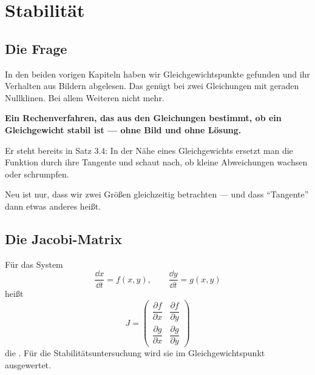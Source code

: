 \chapter{Stabilität}

\section{Die Frage}

In den beiden vorigen Kapiteln haben wir Gleichgewichtspunkte gefunden und ihr Verhalten aus Bildern abgelesen. Das genügt bei zwei Gleichungen mit geraden Nullklinen. Bei allem Weiteren nicht mehr.

\begin{merksatz}
\begin{center}
\begin{minipage}{0.9\textwidth}
\textbf{Ein Rechenverfahren, das aus den Gleichungen bestimmt, ob ein Gleichgewicht stabil ist --- ohne Bild und ohne Lösung.}
\end{minipage}
\end{center}

Er steht bereits in Satz 3.4: In der Nähe eines Gleichgewichts ersetzt man die Funktion durch ihre Tangente und schaut nach, ob kleine Abweichungen wachsen oder schrumpfen.

Neu ist nur, dass wir zwei Größen gleichzeitig betrachten --- und dass \enquote{Tangente} dann etwas anderes heißt.
\end{merksatz}

\section{Die Jacobi-Matrix}

\begin{definition}
Für das System
\[ \frac{\dd x}{\dd t} = f(x,y), \qquad \frac{\dd y}{\dd t} = g(x,y) \]
heißt
\[ J = \begin{pmatrix}
\dfrac{\partial f}{\partial x} & \dfrac{\partial f}{\partial y}\\[8pt]
\dfrac{\partial g}{\partial x} & \dfrac{\partial g}{\partial y}
\end{pmatrix} \]
die . Für die Stabilitätsuntersuchung wird sie im Gleichgewichtspunkt ausgewertet.
\end{definition}

